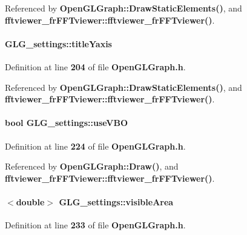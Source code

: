 Referenced by {\bf Open\+G\+L\+Graph\+::\+Draw\+Static\+Elements()}, and {\bf fftviewer\+\_\+fr\+F\+F\+Tviewer\+::fftviewer\+\_\+fr\+F\+F\+Tviewer()}.

\paragraph[{title\+Yaxis}]{ G\+L\+G\+\_\+settings\+::title\+Yaxis}\label{structGLG__settings_a8a919901443f89f68d60526388bb327a}


Definition at line {\bf 204} of file {\bf Open\+G\+L\+Graph.\+h}.



Referenced by {\bf Open\+G\+L\+Graph\+::\+Draw\+Static\+Elements()}, and {\bf fftviewer\+\_\+fr\+F\+F\+Tviewer\+::fftviewer\+\_\+fr\+F\+F\+Tviewer()}.

\paragraph[{use\+V\+BO}]{\setlength{\rightskip}{0pt plus 5cm}bool G\+L\+G\+\_\+settings\+::use\+V\+BO}\label{structGLG__settings_ac255268edc88b9c9ff4a739398b0321a}


Definition at line {\bf 224} of file {\bf Open\+G\+L\+Graph.\+h}.



Referenced by {\bf Open\+G\+L\+Graph\+::\+Draw()}, and {\bf fftviewer\+\_\+fr\+F\+F\+Tviewer\+::fftviewer\+\_\+fr\+F\+F\+Tviewer()}.

\paragraph[{visible\+Area}]{$<$double$>$ G\+L\+G\+\_\+settings\+::visible\+Area}\label{structGLG__settings_a21ddb014b11c1ee08c11a2805fd94d85}


Definition at line {\bf 233} of file {\bf Open\+G\+L\+Graph.\+h}.



